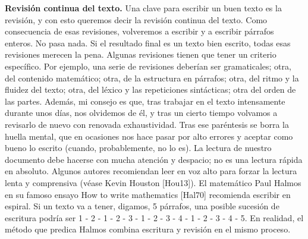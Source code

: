 \hspace{5mm}\textbf{Revisión continua del texto.}
Una clave para escribir un buen texto es la revisión, y con esto queremos decir la revisión continua del texto. Como consecuencia de esas revisiones, volveremos a escribir y a escribir párrafos enteros. No pasa nada. Si el resultado final es un texto bien escrito, todas esas revisiones merecen la pena. Algunas revisiones tienen que tener un criterio específico. Por ejemplo, una serie de revisiones deberían ser gramaticales; otra, del contenido matemático; otra, de la estructura en párrafos; otra, del ritmo y la fluidez del texto; otra, del léxico y las repeticiones sintácticas; otra del orden de las partes. Además, mi consejo es que, tras trabajar en el texto intensamente durante unos días, nos olvidemos de él, y tras un cierto tiempo volvamos a revisarlo de nuevo con renovada exhaustividad. Tras ese paréntesis se borra la huella mental, que en ocasiones nos hace pasar por alto errores y aceptar como bueno lo escrito (cuando, probablemente, no lo es). La lectura de nuestro documento debe hacerse con mucha atención y despacio; no es una lectura rápida en absoluto. Algunos autores recomiendan leer en voz alto para forzar la lectura lenta y comprensiva (véase Kevin Houston [Hou13]). El matemático Paul Halmos en su famoso ensayo How to write mathematics [Hal70] recomienda escribir en espiral. Si un texto va a tener, digamos, 5 párrafos, una posible sucesión de escritura podría ser 1 - 2 - 1 - 2 - 3 - 1 - 2 - 3 - 4 - 1 - 2 - 3 - 4 - 5. En realidad, el método que predica Halmos combina escritura y revisión en el mismo proceso.